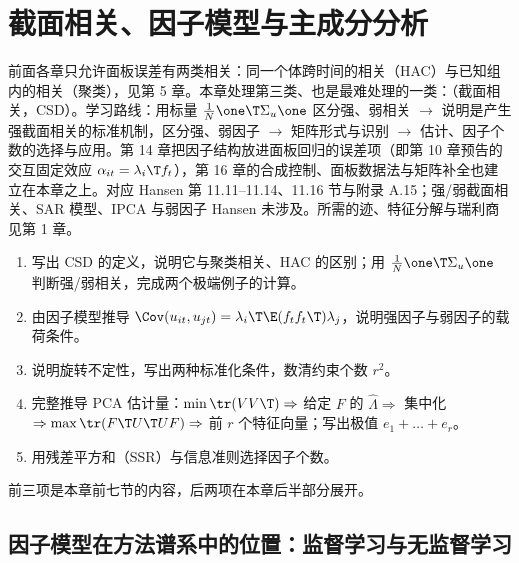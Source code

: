 \chapter{截面相关、因子模型与主成分分析}
\label{ch:U13a-factor}

前面各章只允许面板误差有两类相关：同一个体跨时间的相关（HAC）与已知组内的相关（聚类），见第 5 章。本章处理第三类、也是最难处理的一类：（截面相关，CSD）。学习路线：用标量 $\frac1N\one\T\Sigma_u\one$ 区分强、弱相关 $\to$ 说明是产生强截面相关的标准机制，区分强、弱因子 $\to$ 矩阵形式与识别 $\to$ 估计、因子个数的选择与应用。第 14 章把因子结构放进面板回归的误差项（即第 10 章预告的交互固定效应 $\alpha_{it}=\lambda_i\T f_t$），第 16 章的合成控制、面板数据法与矩阵补全也建立在本章之上。对应 Hansen 第 11.11--11.14、11.16 节与附录 A.15；强/弱截面相关、SAR 模型、IPCA 与弱因子 Hansen 未涉及。所需的迹、特征分解与瑞利商见第 1 章。

\begin{keypt}[本章高频考点]
\begin{enumerate}
  \item 写出 CSD 的定义，说明它与聚类相关、HAC 的区别；用 $\frac1N\one\T\Sigma_u\one$ 判断强/弱相关，完成两个极端例子的计算。
  \item 由因子模型推导 $\Cov(u_{it},u_{jt})=\lambda_i\T\E(f_tf_t\T)\lambda_j$，说明强因子与弱因子的载荷条件。
  \item 说明旋转不定性，写出两种标准化条件，数清约束个数 $r^2$。
  \item 完整推导 PCA 估计量：$\min\tr(VV\T)\Rightarrow$ 给定 $F$ 的 $\hat\Lambda\Rightarrow$ 集中化 $\Rightarrow\max\tr(F\T U\T UF)\Rightarrow$ 前 $r$ 个特征向量；写出极值 $e_1+\dots+e_r$。
  \item 用残差平方和（SSR）与信息准则选择因子个数。
\end{enumerate}
前三项是本章前七节的内容，后两项在本章后半部分展开。
\end{keypt}

\section{因子模型在方法谱系中的位置：监督学习与无监督学习}\label{sec:U13a-position}

